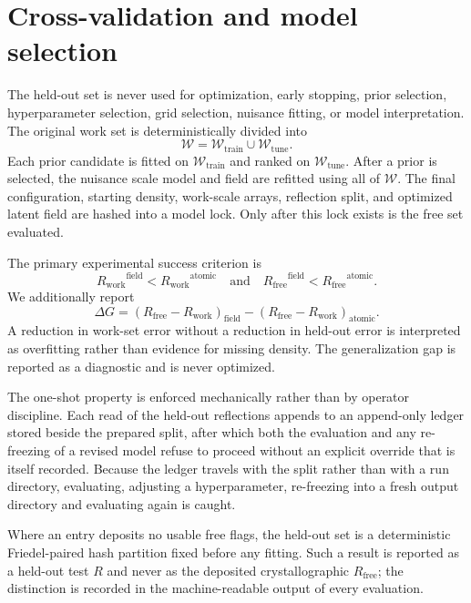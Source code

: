 \documentclass[11pt]{article}
\newcommand{\Rwork}{\ensuremath{R_{\mathrm{work}}}}
\newcommand{\Rfree}{\ensuremath{R_{\mathrm{free}}}}
\begin{document}
\section{Cross-validation and model selection}
\label{sec:crossval}
The held-out set is never used for optimization, early stopping, prior selection, hyperparameter selection, grid selection, nuisance fitting, or model interpretation. The original work set is deterministically divided into
\begin{equation}
  \mathcal W=\mathcal W_{\mathrm{train}}\cup\mathcal W_{\mathrm{tune}}.
\end{equation}
Each prior candidate is fitted on $\mathcal W_{\mathrm{train}}$ and ranked on $\mathcal W_{\mathrm{tune}}$. After a prior is selected, the nuisance scale model and field are refitted using all of $\mathcal W$. The final configuration, starting density, work-scale arrays, reflection split, and optimized latent field are hashed into a model lock. Only after this lock exists is the free set evaluated.

The primary experimental success criterion is
\begin{equation}
  \Rwork^{\mathrm{field}}<\Rwork^{\mathrm{atomic}}
  \quad\mathrm{and}\quad
  \Rfree^{\mathrm{field}}<\Rfree^{\mathrm{atomic}}.
\end{equation}
We additionally report
\begin{equation}
  \Delta G=
  (\Rfree-\Rwork)_{\mathrm{field}}
  -(\Rfree-\Rwork)_{\mathrm{atomic}}.
\end{equation}
A reduction in work-set error without a reduction in held-out error is interpreted as overfitting rather than evidence for missing density. The generalization gap is reported as a diagnostic and is never optimized.

The one-shot property is enforced mechanically rather than by operator discipline. Each read of the held-out reflections appends to an append-only ledger stored beside the prepared split, after which both the evaluation and any re-freezing of a revised model refuse to proceed without an explicit override that is itself recorded. Because the ledger travels with the split rather than with a run directory, evaluating, adjusting a hyperparameter, re-freezing into a fresh output directory and evaluating again is caught.

Where an entry deposits no usable free flags, the held-out set is a deterministic Friedel-paired hash partition fixed before any fitting. Such a result is reported as a held-out test $R$ and never as the deposited crystallographic \Rfree; the distinction is recorded in the machine-readable output of every evaluation.
\end{document}
